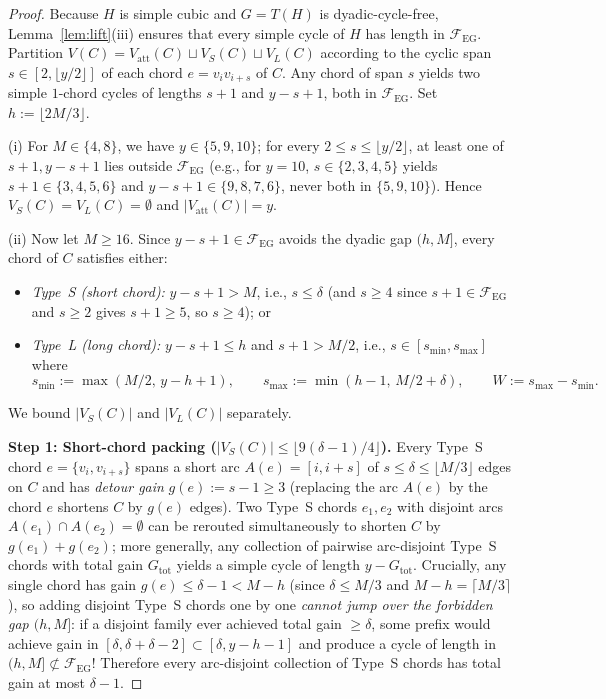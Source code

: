 \documentclass[11pt,reqno]{amsart}
\theoremstyle{plain}
\theoremstyle{definition}
\theoremstyle{remark}
\newcommand{\FEG}{\mathcal{F}_{\mathrm{EG}}}
\newcommand{\Vatt}{V_{\mathrm{att}}}
\DeclareRobustCommand{\_}{\ifmmode\text{\textunderscore}\else\textunderscore\allowbreak\fi}
\begin{document}
\begin{proof}
Because $H$ is simple cubic and $G = T(H)$ is dyadic-cycle-free, Lemma~\ref{lem:lift}(iii) ensures that every simple cycle of $H$ has length in $\FEG$. Partition $V(C) = \Vatt(C) \sqcup V_S(C) \sqcup V_L(C)$ according to the cyclic span $s \in [2, \lfloor y/2 \rfloor]$ of each chord $e = v_i v_{i+s}$ of $C$. Any chord of span $s$ yields two simple $1$-chord cycles of lengths $s + 1$ and $y - s + 1$, both in $\FEG$. Set $h := \lfloor 2M/3 \rfloor$.

(i) For $M \in \{4, 8\}$, we have $y \in \{5, 9, 10\}$; for every $2 \le s \le \lfloor y/2 \rfloor$, at least one of $s + 1, y - s + 1$ lies outside $\FEG$ (e.g., for $y = 10$, $s \in \{2, 3, 4, 5\}$ yields $s + 1 \in \{3, 4, 5, 6\}$ and $y - s + 1 \in \{9, 8, 7, 6\}$, never both in $\{5, 9, 10\}$). Hence $V_S(C) = V_L(C) = \emptyset$ and $|\Vatt(C)| = y$.

(ii) Now let $M \ge 16$. Since $y - s + 1 \in \FEG$ avoids the dyadic gap $(h, M]$, every chord of $C$ satisfies either:
\begin{itemize}[leftmargin=1.6em]
  \item \emph{Type~S (short chord):} $y - s + 1 > M$, i.e., $s \le \delta$ (and $s \ge 4$ since $s + 1 \in \FEG$ and $s \ge 2$ gives $s + 1 \ge 5$, so $s \ge 4$); or
  \item \emph{Type~L (long chord):} $y - s + 1 \le h$ and $s + 1 > M/2$, i.e., $s \in [s_{\min}, s_{\max}]$ where
  \[
    s_{\min} := \max(M/2,\, y - h + 1), \qquad s_{\max} := \min(h - 1,\, M/2 + \delta), \qquad W := s_{\max} - s_{\min}.
  \]
\end{itemize}
We bound $|V_S(C)|$ and $|V_L(C)|$ separately.

\medskip
\noindent\textbf{Step 1: Short-chord packing ($|V_S(C)| \le \lfloor 9(\delta - 1)/4 \rfloor$).}
Every Type~S chord $e = \{v_i, v_{i+s}\}$ spans a short arc $A(e) = [i, i + s]$ of $s \le \delta \le \lfloor M/3 \rfloor$ edges on $C$ and has \emph{detour gain} $g(e) := s - 1 \ge 3$ (replacing the arc $A(e)$ by the chord $e$ shortens $C$ by $g(e)$ edges). Two Type~S chords $e_1, e_2$ with disjoint arcs $A(e_1) \cap A(e_2) = \emptyset$ can be rerouted simultaneously to shorten $C$ by $g(e_1) + g(e_2)$; more generally, any collection of pairwise arc-disjoint Type~S chords with total gain $G_{\mathrm{tot}}$ yields a simple cycle of length $y - G_{\mathrm{tot}}$. Crucially, any single chord has gain $g(e) \le \delta - 1 < M - h$ (since $\delta \le M/3$ and $M - h = \lceil M/3 \rceil$), so adding disjoint Type~S chords one by one \emph{cannot jump over the forbidden gap $(h, M]$}: if a disjoint family ever achieved total gain $\ge \delta$, some prefix would achieve gain in $[\delta, \delta + \delta - 2] \subset [\delta, y - h - 1]$ and produce a cycle of length in $(h, M] \not\subset \FEG$! Therefore every arc-disjoint collection of Type~S chords has total gain at most $\delta - 1$.


\end{proof}
\end{document}
